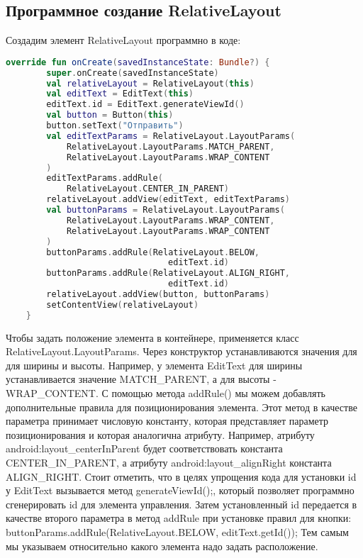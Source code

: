 \subsection{Программное создание RelativeLayout}
Создадим элемент RelativeLayout программно в коде:
\begin{lstlisting}[language=Kotlin, caption=\leftline{Kotlin}, label=lst:RelativeLayout2]
override fun onCreate(savedInstanceState: Bundle?) {
        super.onCreate(savedInstanceState)
        val relativeLayout = RelativeLayout(this)
        val editText = EditText(this)
        editText.id = EditText.generateViewId()
        val button = Button(this)
        button.setText("Отправить")
        val editTextParams = RelativeLayout.LayoutParams(
            RelativeLayout.LayoutParams.MATCH_PARENT,
            RelativeLayout.LayoutParams.WRAP_CONTENT
        )
        editTextParams.addRule(
            RelativeLayout.CENTER_IN_PARENT)
        relativeLayout.addView(editText, editTextParams)
        val buttonParams = RelativeLayout.LayoutParams(
            RelativeLayout.LayoutParams.WRAP_CONTENT,
            RelativeLayout.LayoutParams.WRAP_CONTENT
        )
        buttonParams.addRule(RelativeLayout.BELOW,
                                editText.id)
        buttonParams.addRule(RelativeLayout.ALIGN_RIGHT,
                                editText.id)
        relativeLayout.addView(button, buttonParams)
        setContentView(relativeLayout)
    }
\end{lstlisting}
Чтобы задать положение элемента в контейнере, применяется класс
RelativeLayout.LayoutParams.
Через конструктор устанавливаются значения
для для ширины и высоты.
Например, у элемента EditText для ширины
устанавливается значение MATCH\_PARENT, а для высоты -
WRAP\_CONTENT.
С помощью метода addRule() мы можем добавлять дополнительные правила
для позиционирования элемента.
Этот метод в качестве параметра принимает
числовую константу, которая представляет параметр позиционирования и
которая аналогична атрибуту.
Например, атрибуту
android:layout\_centerInParent будет соответствовать константа
CENTER\_IN\_PARENT, а атрибуту android:layout\_alignRight константа
ALIGN\_RIGHT.
Стоит отметить, что в целях упрощения кода для установки id у EditText
вызывается метод generateViewId();, который позволяет программно
сгенерировать id для элемента управления.
Затем установленный id передается в качестве второго параметра в метод
addRule при установке правил для кнопки:
buttonParams.addRule(RelativeLayout.BELOW, editText.getId());
Тем самым мы указываем относительно какого элемента надо задать
расположение.
